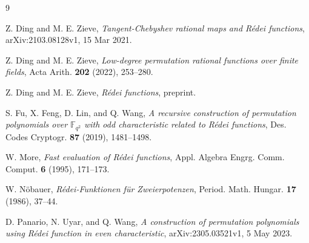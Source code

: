 \documentclass[11pt]{amsart}
\numberwithin{equation}{section}
\theoremstyle{definition}
\newcommand{\F}{\mathbb{F}}
\begin{document}
%
\begin{thebibliography}{9}
\newcommand{\au}[1]{{#1},}
\newcommand{\ti}[1]{\textit{#1},}
\newcommand{\jo}[1]{{#1}}
\newcommand{\vo}[1]{\textbf{#1}}
\newcommand{\yr}[1]{(#1),}
\newcommand{\ppx}[1]{#1,}
\newcommand{\pp}[1]{#1.}
\newcommand{\pps}[1]{#1}
\newcommand{\bk}[1]{{#1},}
\newcommand{\inbk}[1]{in: \bk{#1}}
\newcommand{\xxx}[1]{{arXiv:#1}.}

\au{Z. Ding and M. E. Zieve}
\ti{Tangent-Chebyshev rational maps and R\'edei functions}
arXiv:2103.08128v1, 15 Mar 2021.

\au{Z. Ding and M. E. Zieve}
\ti{Low-degree permutation rational functions over finite fields}
\jo{Acta Arith.}
\vo{202}
\yr{2022}
\pp{253--280}

\au{Z. Ding and M. E. Zieve}
\ti{R\'edei functions}
preprint.

\au{S. Fu, X. Feng, D. Lin, and Q. Wang}
\ti{A recursive construction of permutation polynomials over $\F_{q^2}$ with odd characteristic related to R\'edei functions}
\jo{Des. Codes Cryptogr.}
\vo{87}
\yr{2019}
\pp{1481--1498}

\au{W. More}
\ti{Fast evaluation of R\'edei functions}
\jo{Appl. Algebra Engrg. Comm. Comput.}
\vo{6}
\yr{1995}
\pp{171--173}

\au{W. N\"obauer}
\ti{R\'edei-Funktionen f\"ur Zweierpotenzen}
\jo{Period. Math. Hungar.}
\vo{17}
\yr{1986}
\pp{37--44}

\au{D. Panario, N. Uyar, and Q. Wang}
\ti{A construction of permutation polynomials using R\'edei function in even characteristic}
arXiv:2305.03521v1, 5 May 2023.


\end{thebibliography}
\end{document}
